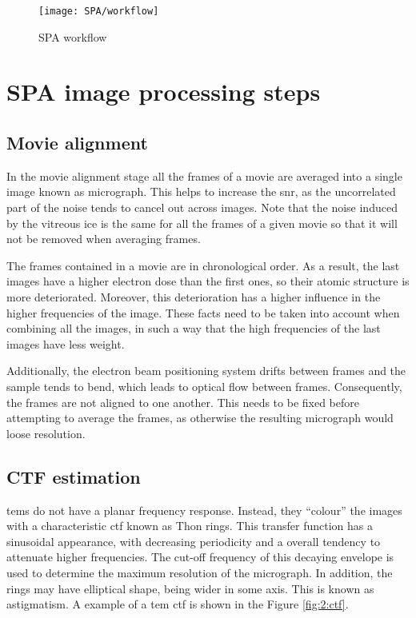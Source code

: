 \documentclass[../main.tex]{subfiles}
\begin{document}
\begin{landscape}
    \begin{figure}
        \centering
        \texttt{[image: SPA/workflow]}
        \caption{SPA workflow}
        \label{fig:2:spa_workflow}
    \end{figure}
\end{landscape}

\section{SPA image processing steps}

\subsection{Movie alignment}
In the movie alignment stage all the frames of a movie are averaged into a single image known as micrograph. This helps to increase the \gls{snr}, as the uncorrelated part of the noise tends to cancel out across images. Note that the noise induced by the vitreous ice is the same for all the frames of a given movie so that it will not be removed when averaging frames. 

The frames contained in a movie are in chronological order. As a result, the last images have a higher electron dose than the first ones, so their atomic structure is more deteriorated. Moreover, this deterioration has a higher influence in the higher frequencies of the image. These facts need to be taken into account when combining all the images, in such a way that the high frequencies of the last images have less weight\cite{cryoem101}. 

Additionally, the electron beam positioning system drifts between frames and the sample tends to bend, which leads to optical flow between frames. Consequently, the frames are not aligned to one another. This needs to be fixed before attempting to average the frames, as otherwise the resulting micrograph would loose resolution.

\subsection{CTF estimation}
\Glspl{tem} do not have a planar frequency response. Instead, they ``colour'' the images with a characteristic \gls{ctf} known as Thon rings. This transfer function has a sinusoidal appearance, with decreasing periodicity and a overall tendency to attenuate higher frequencies\cite{cryoem101}. The cut-off frequency of this decaying envelope is used to determine the maximum resolution of the micrograph. In addition, the rings may have elliptical shape, being wider in some axis. This is known as astigmatism. A example of a \gls{tem} \gls{ctf} is shown in the Figure \ref{fig:2:ctf}.
\end{document}
